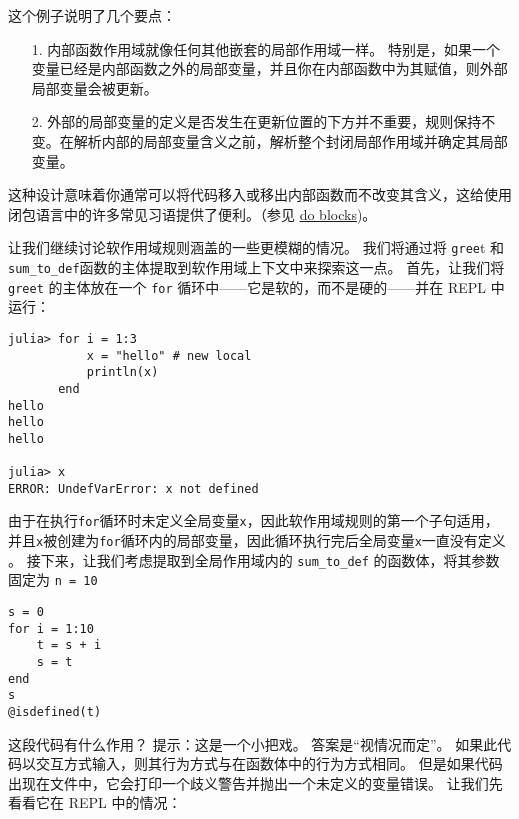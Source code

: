 这个例子说明了几个要点：



\begin{itemize}
\item[1. ] 内部函数作用域就像任何其他嵌套的局部作用域一样。 特别是，如果一个变量已经是内部函数之外的局部变量，并且你在内部函数中为其赋值，则外部局部变量会被更新。


\item[2. ] 外部的局部变量的定义是否发生在更新位置的下方并不重要，规则保持不变。在解析内部的局部变量含义之前，解析整个封闭局部作用域并确定其局部变量。

\end{itemize}


这种设计意味着你通常可以将代码移入或移出内部函数而不改变其含义，这给使用闭包语言中的许多常见习语提供了便利。（参见 \hyperlink{1155949704550919454}{do blocks})。



让我们继续讨论软作用域规则涵盖的一些更模糊的情况。 我们将通过将 \texttt{gree}t 和 \texttt{sum\_to\_def}函数的主体提取到软作用域上下文中来探索这一点。 首先，让我们将 \texttt{greet} 的主体放在一个 \texttt{for} 循环中——它是软的，而不是硬的——并在 REPL 中运行：




\begin{verbatim}
julia> for i = 1:3
           x = "hello" # new local
           println(x)
       end
hello
hello
hello

julia> x
ERROR: UndefVarError: x not defined
\end{verbatim}



由于在执行\texttt{for}循环时未定义全局变量\texttt{x}，因此软作用域规则的第一个子句适用，并且\texttt{x}被创建为\texttt{for}循环内的局部变量，因此循环执行完后全局变量\texttt{x}一直没有定义 。 接下来，让我们考虑提取到全局作用域内的 \texttt{sum\_to\_def} 的函数体，将其参数固定为 \texttt{n = 10}




\begin{verbatim}
s = 0
for i = 1:10
    t = s + i
    s = t
end
s
@isdefined(t)
\end{verbatim}



这段代码有什么作用？ 提示：这是一个小把戏。 答案是“视情况而定”。 如果此代码以交互方式输入，则其行为方式与在函数体中的行为方式相同。 但是如果代码出现在文件中，它会打印一个歧义警告并抛出一个未定义的变量错误。 让我们先看看它在 REPL 中的情况：




